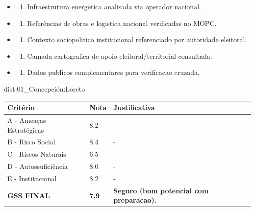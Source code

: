 {\begin{itemize}
\item
  \begin{enumerate}
  \def\labelenumi{\arabic{enumi})}
  \setcounter{enumi}{7}
  \tightlist
  \item
    Infraestrutura energetica analisada via operador nacional.
  \end{enumerate}
\item
  \begin{enumerate}
  \def\labelenumi{\arabic{enumi})}
  \setcounter{enumi}{8}
  \tightlist
  \item
    Referências de obras e logistica nacional verificadas no MOPC.
  \end{enumerate}
\item
  \begin{enumerate}
  \def\labelenumi{\arabic{enumi})}
  \setcounter{enumi}{9}
  \tightlist
  \item
    Contexto sociopolitico institucional referenciado por autoridade
    eleitoral.
  \end{enumerate}
\item
  \begin{enumerate}
  \def\labelenumi{\arabic{enumi})}
  \setcounter{enumi}{10}
  \tightlist
  \item
    Camada cartografica de apoio eleitoral/\allowbreak \allowbreak territorial consultada.
  \end{enumerate}
\item
  \begin{enumerate}
  \def\labelenumi{\arabic{enumi})}
  \setcounter{enumi}{11}
  \tightlist
  \item
    Dados publicos complementares para verificacao cruzada.
  \end{enumerate}
\end{itemize}}{dist:01_Concepción:Loreto}
\begin{table}[ht!]
\small \begin{tabular}{p{3.0cm}p{0.8cm}p{6.0cm}} \toprule
\textbf{Critério} & \textbf{Nota} & \textbf{Justificativa} \\ \midrule
A - Ameaças Estratégicas & 8.2 & - \\
B - Risco Social & 8.4 & - \\
C - Riscos Naturais & 6.5 & - \\
D - Autossuficiência & 8.0 & - \\
E - Institucional & 8.2 & - \\
\midrule \textbf{GSS FINAL} & \textbf{7.9} & \textbf{Seguro (bom potencial com preparacao).} \\ \bottomrule \end{tabular}
\end{table}
\newpage

